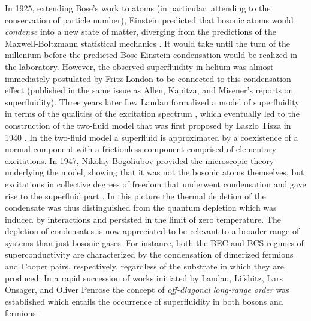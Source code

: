 	In 1925, extending Bose's work to atoms (in particular, attending to the conservation of particle number), Einstein predicted  that bosonic atoms would \emph{condense} into a new state of matter, diverging from the predictions of the Maxwell-Boltzmann statistical mechanics \cite{Einstein25}. 	
	It would take until the turn of the millenium before the predicted Bose-Einstein condensation would be realized in the laboratory.
	However, the observed superfluidity in helium was almost immediately postulated by Fritz London to be connected to this condensation effect \cite{London38} (published in the same issue as Allen, Kapitza, and Misener's reports on superfluidity).
	Three years later Lev Landau formalized a model of superfluidity in terms of the qualities of the excitation spectrum \cite{Landau41}, which eventually led to the construction of the two-fluid model that was first proposed by Laszlo Tisza in 1940 \cite{Tisza38}.
	In the two-fluid model a superfluid is approximated by a coexistence of a normal component with a frictionless component comprised of elementary excitations.
	In 1947, Nikolay Bogoliubov provided the microscopic theory underlying the model, showing that it was not the bosonic atoms themselves, but excitations in collective degrees of freedom that underwent condensation and gave rise to the superfluid part \cite{Bogoliubov47}.
	In this picture the thermal depletion of the condensate was thus distinguished from the quantum depletion which was induced by interactions and persisted in the limit of zero temperature.
	The depletion of condensates is now appreciated to be relevant to a broader range of systems than just bosonic gases.
	For instance, both the BEC and BCS regimes of superconductivity are characterized by the condensation of dimerized fermions and Cooper pairs, respectively, regardless of the substrate in which they are produced.
	In a rapid succession of works initiated by Landau, Lifshitz, Lars Onsager, and Oliver Penrose \cite{Yang62}  the concept of \emph{off-diagonal long-range order} was established which entails the occurrence of superfluidity in both bosons and fermions \cite{PitaevskiiStringari}.
	


